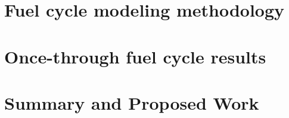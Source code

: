 \documentclass[edeposit,fullpage]{uiucthesis2018}
\begin{document}
\chapter{Fuel cycle modeling methodology} \label{ch:fc_methods}


\chapter{Once-through fuel cycle results} \label{ch:once_through_results}


\chapter{Summary and Proposed Work} \label{ch:summary}


%

\backmatter



\end{document}
